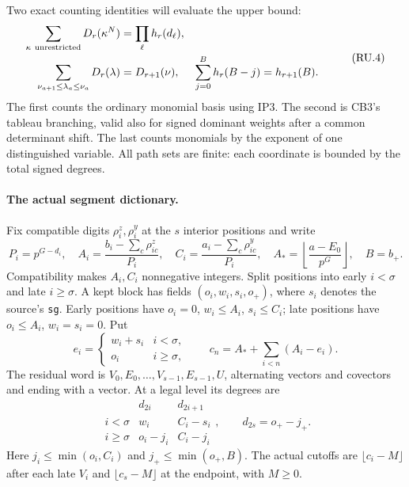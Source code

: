 \documentclass[11pt,a4paper]{article}
\numberwithin{equation}{section}
\theoremstyle{remark}\newtheorem{remark}[theorem]{Remark}
\begin{document}
Two exact counting identities will evaluate the upper bound:
\[
 \begin{aligned}
 \sum_{\kappa\ {\rm unrestricted}}D_r(\kappa^N)
       &=\prod_\ell h_r(d_\ell),\\
 \sum_{\nu_{a+1}\le\lambda_a\le\nu_a}D_r(\lambda)
       &=D_{r+1}(\nu),&
 \sum_{j=0}^{B}h_r(B-j)&=h_{r+1}(B).
 \end{aligned}                                             \tag{RU.4}
\]
The first counts the ordinary monomial basis using IP3. The second
is CB3's tableau branching, valid also for signed dominant weights
after a common determinant shift. The last counts monomials by the
exponent of one distinguished variable. All path sets are finite:
each coordinate is bounded by the total signed degrees.

\paragraph{The actual segment dictionary.}
Fix compatible digits $\rho_i^z,\rho_i^y$ at the $s$ interior
positions and write
\[
 P_i=p^{G-d_i},\quad
 A_i=\frac{b_i-\sum_c\rho^z_{ic}}{P_i},\quad
 C_i=\frac{a_i-\sum_c\rho^y_{ic}}{P_i},\quad
 A_*=\left\lfloor\frac{a-E_0}{p^G}\right\rfloor,\quad B=b_+.
                                                               \tag{RU.5}
\]
Compatibility makes $A_i,C_i$ nonnegative integers.
Split positions into early $i<\sigma$ and late $i\ge\sigma$.
A kept block has fields $(o_i,w_i,s_i,o_+)$, where $s_i$ denotes
the source's \texttt{sg}. Early positions have
$o_i=0$, $w_i\le A_i$, $s_i\le C_i$; late positions have
$o_i\le A_i$, $w_i=s_i=0$. Put
\[
 e_i=\begin{cases}w_i+s_i&i<\sigma,\\o_i&i\ge\sigma,\end{cases}
 \qquad c_n=A_*+\sum_{i<n}(A_i-e_i).                         \tag{RU.6}
\]
The residual word is $V_0,E_0,\ldots,V_{s-1},E_{s-1},U$,
alternating vectors and covectors and ending with a vector. At a
legal level its degrees are
\[
 \begin{array}{c|cc}
 &d_{2i}&d_{2i+1}\\ \hline
 i<\sigma&w_i&C_i-s_i\\
 i\ge\sigma&o_i-j_i&C_i-j_i
 \end{array},
 \qquad d_{2s}=o_+-j_+.                                    \tag{RU.7}
\]
Here $j_i\le\min(o_i,C_i)$ and $j_+\le\min(o_+,B)$.
The actual cutoffs are $\lfloor c_i-M\rfloor$ after each late
$V_i$ and $\lfloor c_s-M\rfloor$ at the endpoint, with $M\ge0$.
\end{document}
